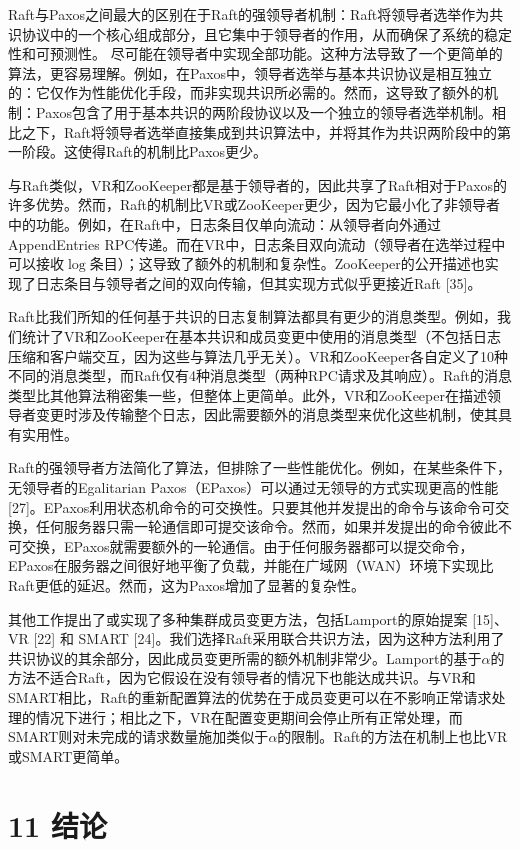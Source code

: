 \documentclass[12pt,a4paper]{report} %
\begin{document}
Raft与Paxos之间最大的区别在于Raft的强领导者机制：Raft将领导者选举作为共识协议中的一个核心组成部分，且它集中于领导者的作用，从而确保了系统的稳定性和可预测性。
尽可能在领导者中实现全部功能。这种方法导致了一个更简单的算法，更容易理解。例如，在Paxos中，领导者选举与基本共识协议是相互独立的：它仅作为性能优化手段，而非实现共识所必需的。然而，这导致了额外的机制：Paxos包含了用于基本共识的两阶段协议以及一个独立的领导者选举机制。相比之下，Raft将领导者选举直接集成到共识算法中，并将其作为共识两阶段中的第一阶段。这使得Raft的机制比Paxos更少。

与Raft类似，VR和ZooKeeper都是基于领导者的，因此共享了Raft相对于Paxos的许多优势。然而，Raft的机制比VR或ZooKeeper更少，因为它最小化了非领导者中的功能。例如，在Raft中，日志条目仅单向流动：从领导者向外通过AppendEntries RPC传递。而在VR中，日志条目双向流动（领导者在选举过程中可以接收$\log$条目）；这导致了额外的机制和复杂性。ZooKeeper的公开描述也实现了日志条目与领导者之间的双向传输，但其实现方式似乎更接近Raft [35]。

Raft比我们所知的任何基于共识的日志复制算法都具有更少的消息类型。例如，我们统计了VR和ZooKeeper在基本共识和成员变更中使用的消息类型（不包括日志压缩和客户端交互，因为这些与算法几乎无关）。VR和ZooKeeper各自定义了10种不同的消息类型，而Raft仅有4种消息类型（两种RPC请求及其响应）。Raft的消息类型比其他算法稍密集一些，但整体上更简单。此外，VR和ZooKeeper在描述领导者变更时涉及传输整个日志，因此需要额外的消息类型来优化这些机制，使其具有实用性。

Raft的强领导者方法简化了算法，但排除了一些性能优化。例如，在某些条件下，无领导者的Egalitarian Paxos（EPaxos）可以通过无领导的方式实现更高的性能 [27]。EPaxos利用状态机命令的可交换性。只要其他并发提出的命令与该命令可交换，任何服务器只需一轮通信即可提交该命令。然而，如果并发提出的命令彼此不可交换，EPaxos就需要额外的一轮通信。由于任何服务器都可以提交命令，EPaxos在服务器之间很好地平衡了负载，并能在广域网（WAN）环境下实现比Raft更低的延迟。然而，这为Paxos增加了显著的复杂性。

其他工作提出了或实现了多种集群成员变更方法，包括Lamport的原始提案 [15]、VR [22] 和 SMART [24]。我们选择Raft采用联合共识方法，因为这种方法利用了共识协议的其余部分，因此成员变更所需的额外机制非常少。Lamport的基于$\alpha$的方法不适合Raft，因为它假设在没有领导者的情况下也能达成共识。与VR和SMART相比，Raft的重新配置算法的优势在于成员变更可以在不影响正常请求处理的情况下进行；相比之下，VR在配置变更期间会停止所有正常处理，而SMART则对未完成的请求数量施加类似于$\alpha$的限制。Raft的方法在机制上也比VR或SMART更简单。

\section*{11 结论}
\end{document}
